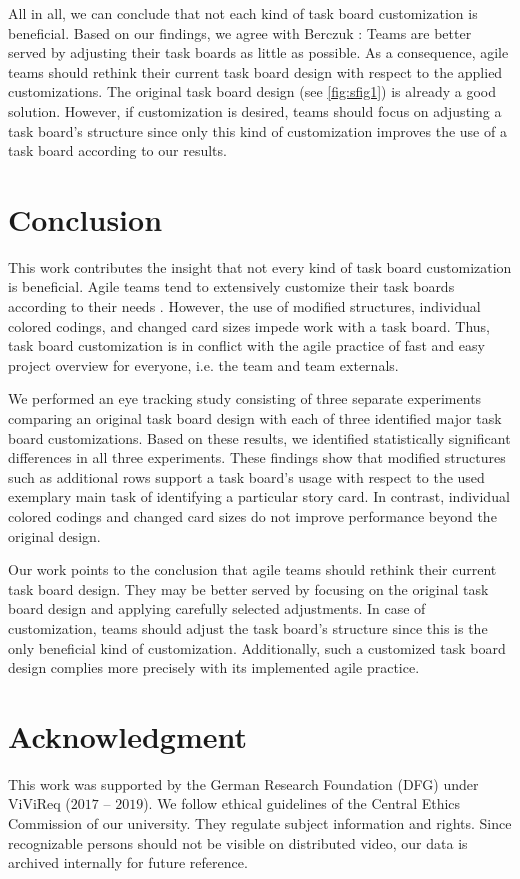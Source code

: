\documentclass{llncs}
\begin{document}
All in all, we can conclude that not each kind of task board customization is 
beneficial. Based on our findings, we agree with Berczuk \cite{Berczuk.2007}: 
Teams are better served by adjusting their task boards as little as possible.
As a consequence, agile teams should rethink their current task board design 
with respect to the applied customizations. The original task board design (see 
\figurename{ \ref{fig:sfig1}}) is already a good solution. However, if 
customization is desired, teams should focus on adjusting a task board's 
structure since only this kind of customization improves the use of a 
task board according to our results.

\section{Conclusion}
\label{sec:conclusion}
This work contributes the insight that not every kind of task board 
customization is beneficial. Agile teams tend to extensively customize their 
task boards according to their needs \cite{Sharp.2009}. However, the use of 
modified structures, individual colored codings, and changed card sizes 
impede work with a task board. Thus, task board customization is in 
conflict with the agile practice of fast and easy project overview for 
everyone, i.e. the team and team externals.

We performed an eye tracking study consisting of three separate experiments 
comparing an original task board design with each of three identified major 
task board customizations. Based on these results, we identified statistically 
significant differences in all three experiments. These findings show that 
modified structures such as additional rows support a task board's usage with 
respect to the used exemplary main task of identifying a particular story card. 
In contrast, individual colored codings and changed card sizes do not improve 
performance beyond the original design.

Our work points to the conclusion that agile teams should rethink their current 
task board design. They may be better served by focusing on the original task 
board design and applying carefully selected adjustments. In case of 
customization, teams should adjust the task board's structure since this is the 
only beneficial kind of customization. Additionally, such a customized task 
board design complies more precisely with its implemented agile practice.

\section*{Acknowledgment}
This work was supported by the German Research Foundation (DFG) under ViViReq 
($2017$ -- $2019$). We follow ethical guidelines of the Central Ethics 
Commission of our university. They regulate subject information and rights. 
Since recognizable persons should not be visible on distributed video, our data 
is archived internally for future reference.



\end{document}
